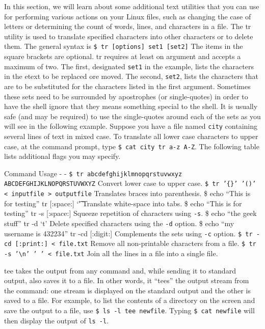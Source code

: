 In this section, we will learn about some additional text utilities that
you can use for performing various actions on your Linux files, such as
changing the case of letters or determining the count of words, lines,
and characters in a file. The tr utility is used to translate specified
characters into other characters or to delete them. The general syntax
is \texttt{\$ tr {[}options{]} set1 {[}set2{]}} The items in the square
brackets are optional. tr requires at least on argument and accepts a
maximum of two. The first, designated \texttt{set1} in the example,
lists the characters in the etext to be replaced ore moved. The second,
\texttt{set2}, lists the characters that are to be substituted for the
characters listed in the first argument. Sometimes these sets need to be
surrounded by apostrophes (or single-quotes) in order to have the shell
ignore that they means something special to the shell. It is usually
safe (and may be required) to use the single-quotes around each of the
sets as you will see in the following example. Suppose you have a file
named \texttt{city} containing several lines of text in mixed case. To
translate all lower case characters to upper case, at the command
prompt, type \texttt{\$ cat city \textbar{} tr a-z A-Z}. The following
table lists additional flags you may specify.

Command \textbar{} Usage - \textbar{} -
\texttt{\$ tr abcdefghijklmnopqrstuvwxyz ABCDEFGHIJKLNOPQRSTUVWXYZ}
\textbar{} Convert lower case to upper case.
\texttt{\$ tr '\{\}' '()' \textless{} inputfile \textgreater{} outputfile}
\textbar{} Translates braces into parenthesis. \$ echo ``This is for
testing'' \textbar{} tr {[}:space:{]} `\t' \textbar{} Translate
white-space into tabs. \$ echo ``This is for testing'' \textbar{} tr -s
{[}:space:{]} \textbar{} Squeeze repetition of characters using
\texttt{-s}. \$ echo ``the geek stuff'' \textbar{} tr -d `t' \textbar{}
Delete specified characters using the \texttt{-d} option. \$ echo ``my
username is 432234'' \textbar{} tr -cd {[}:digit:{]} \textbar{}
Complements the sets using \texttt{-c} option.
\texttt{\$ tr -cd {[}:print:{]} \textless{} file.txt} \textbar{} Remove
all non-printable characters from a file.
\texttt{\$ tr -s '\textbackslash{}n' ' ' \textless{} file.txt}
\textbar{} Join all the lines in a file into a single file.

tee takes the output from any command and, while sending it to standard
output, also saves it to a file. In other words, it ``tees'' the output
stream from the command: one stream is displayed on the standard output
and the other is saved to a file. For example, to list the contents of a
directory on the screen and save the output to a file, use
\texttt{\$ ls -l \textbar{} tee newfile}. Typing \texttt{\$ cat newfile}
will then display the output of \texttt{ls -l}.

